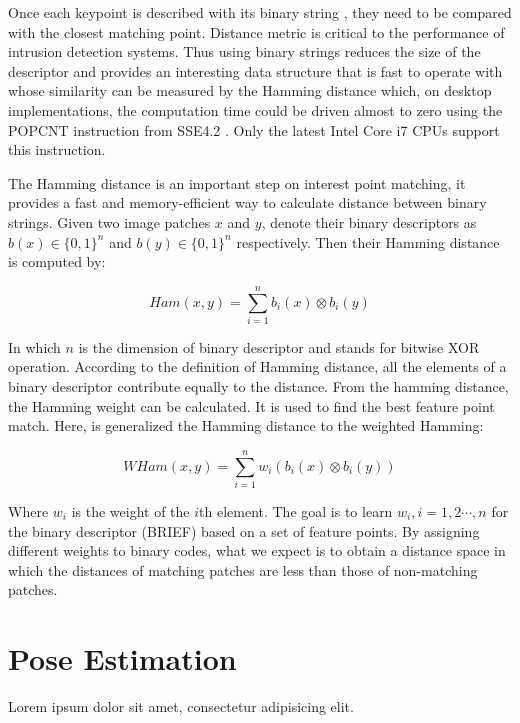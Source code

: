 Once each keypoint is described with its binary string \cite{Calonder2010}, they need to be compared with the closest matching point. Distance metric is critical to the performance of intrusion detection systems. Thus using binary strings reduces the size of the descriptor and provides an interesting data structure that is fast to operate with whose similarity can be measured by the Hamming distance which, on desktop implementations, the computation time could be driven almost to zero using the POPCNT instruction from SSE4.2 \cite{Intel2007}. Only the latest Intel Core i7 CPUs support this instruction.

The Hamming distance is an important step on interest point matching, it provides a fast and memory-efficient way to calculate distance between binary strings. Given two image patches $x$ and $y$, denote their binary descriptors as $b(x) \in \{0,1\}^n$ and $b(y) \in \{0,1\}^n$ respectively. Then their Hamming distance is computed by:

$$Ham(x, y)=\sum_{i=1}^{n}b_i(x)\otimes b_i(y)$$

In which $n$ is the dimension of binary descriptor and stands for bitwise XOR operation. According to the definition of Hamming distance, all the elements of a binary descriptor contribute equally to the distance. From the hamming distance, the Hamming weight can be calculated. It is used to find the best feature point match. Here, is generalized the Hamming distance to the weighted Hamming:

$$WHam(x, y)=\sum_{i=1}^{n}w_i(b_i(x)\otimes b_i(y))$$

Where $w_i$ is the weight of the $i$th element. The goal is to learn $w_i,i=1,2\cdots,n$ for the binary descriptor (BRIEF) based on a set of feature points. By assigning different weights to binary codes, what we expect is to obtain a distance space in which the distances of matching patches are less than those of non-matching patches.


\section{Pose Estimation} %
\label{sec:ar_library_for_the_web:pose_estimation}

Lorem ipsum dolor sit amet, consectetur adipisicing elit.


